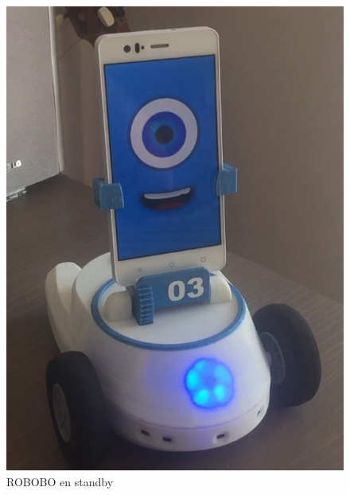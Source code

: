 \begin{figure}
\centering
\begin{minipage}{0.45\textwidth}
\centering
\includegraphics[width=1\linewidth]{imagenes/vigilante_standby.png}
\caption{ROBOBO en standby}
\label{fig:vigilante-standby}


\end{minipage}
\end{figure}
